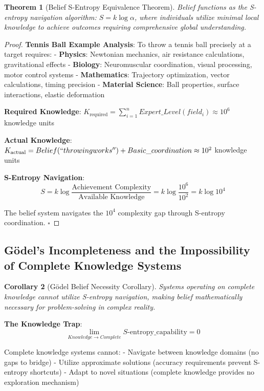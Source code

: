\documentclass[12pt,a4paper]{article}
\newtheorem{theorem}{Theorem}[section]
\newtheorem{corollary}[theorem]{Corollary}
\begin{document}
\begin{theorem}[Belief S-Entropy Equivalence Theorem]
Belief functions as the S-entropy navigation algorithm: $S = k \log \alpha$, where individuals utilize minimal local knowledge to achieve outcomes requiring comprehensive global understanding.
\end{theorem}

\begin{proof}
\textbf{Tennis Ball Example Analysis}:
To throw a tennis ball precisely at a target requires:
- \textbf{Physics}: Newtonian mechanics, air resistance calculations, gravitational effects
- \textbf{Biology}: Neuromuscular coordination, visual processing, motor control systems
- \textbf{Mathematics}: Trajectory optimization, vector calculations, timing precision
- \textbf{Material Science}: Ball properties, surface interactions, elastic deformation

\textbf{Required Knowledge}: $K_{\text{required}} = \sum_{i=1}^{n} Expert\_Level(field_i) \approx 10^6$ knowledge units

\textbf{Actual Knowledge}: $K_{\text{actual}} = Belief(``throwing works'') + Basic\_coordination \approx 10^2$ knowledge units

\textbf{S-Entropy Navigation}:
$$S = k \log \frac{\text{Achievement Complexity}}{\text{Available Knowledge}} = k \log \frac{10^6}{10^2} = k \log 10^4$$

The belief system navigates the $10^4$ complexity gap through S-entropy coordination. $\square$
\end{proof}

\subsection{Gödel's Incompleteness and the Impossibility of Complete Knowledge Systems}

\begin{corollary}[Gödel Belief Necessity Corollary]
Systems operating on complete knowledge cannot utilize S-entropy navigation, making belief mathematically necessary for problem-solving in complex reality.
\end{corollary}

\textbf{The Knowledge Trap}:
$$\lim_{Knowledge \to Complete} S\text{-entropy\_capability} = 0$$

Complete knowledge systems cannot:
- Navigate between knowledge domains (no gaps to bridge)
- Utilize approximate solutions (accuracy requirements prevent S-entropy shortcuts)
- Adapt to novel situations (complete knowledge provides no exploration mechanism)
\end{document}
